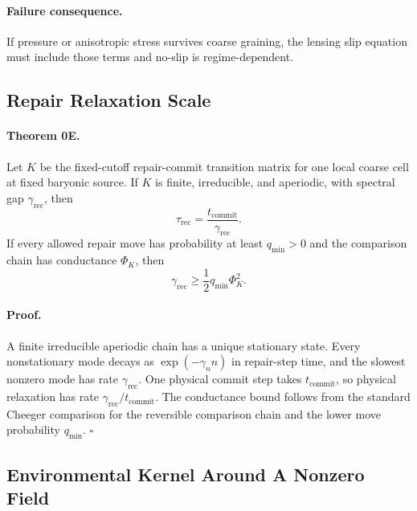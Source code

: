 \documentclass[11pt]{article}
\begin{document}
\paragraph{Failure consequence.}
If pressure or anisotropic stress survives coarse graining, the lensing slip
equation must include those terms and no-slip is regime-dependent.

\subsection{Repair Relaxation Scale}

\paragraph{Theorem 0E.}
Let \(K\) be the fixed-cutoff repair-commit transition matrix for one local
coarse cell at fixed baryonic source.  If \(K\) is finite, irreducible, and
aperiodic, with spectral gap \(\gamma_{\mathrm{rec}}\), then
\begin{equation}
  \tau_{\mathrm{rec}}
  =\frac{t_{\mathrm{commit}}}{\gamma_{\mathrm{rec}}}.
\end{equation}
If every allowed repair move has probability at least \(q_{\min}>0\) and the
comparison chain has conductance \(\Phi_K\), then
\begin{equation}
  \gamma_{\mathrm{rec}}\ge \frac12 q_{\min}\Phi_K^2.
\end{equation}

\paragraph{Proof.}
A finite irreducible aperiodic chain has a unique stationary state.  Every
nonstationary mode decays as \(\exp(-\gamma_n n)\) in repair-step time, and
the slowest nonzero mode has rate \(\gamma_{\mathrm{rec}}\).  One physical
commit step takes \(t_{\mathrm{commit}}\), so physical relaxation has rate
\(\gamma_{\mathrm{rec}}/t_{\mathrm{commit}}\).  The conductance bound follows
from the standard Cheeger comparison for the reversible comparison chain and
the lower move probability \(q_{\min}\). \(\square\)

\subsection{Environmental Kernel Around A Nonzero Field}
\end{document}
